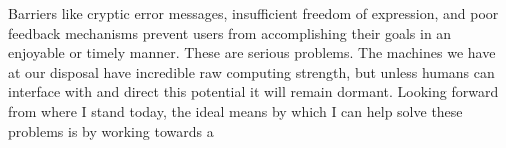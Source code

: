 \documentclass{article}
\begin{document}
Barriers like cryptic error messages, insufficient freedom of expression, and poor feedback mechanisms prevent users from accomplishing their goals in an enjoyable or timely manner.
These are serious problems.
The machines we have at our disposal have incredible raw computing strength, but unless humans can interface with and direct this potential it will remain dormant.
Looking forward from where I stand today, the ideal means by which I can help solve these problems is by working towards a \phd

\end{document}
